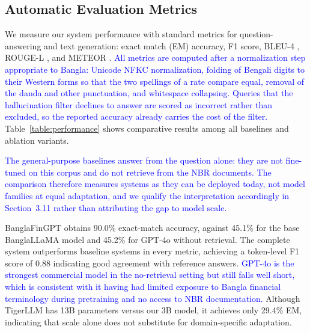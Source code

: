 \documentclass{article}
\newcommand{\revised}[1]{\textcolor{blue}{#1}}
\newcommand{\revised}[1]{#1}
\begin{document}
\subsection{Automatic Evaluation Metrics}
\label{sec:automatic-metrics}

We measure our system performance with standard metrics for question-answering and text
generation: exact match (EM) accuracy, F1 score, BLEU-4 \cite{papineni2002}, ROUGE-L
\cite{lin2004rouge}, and METEOR \cite{banerjee2005}. \revised{All metrics are computed
after a normalization step appropriate to Bangla: Unicode NFKC normalization, folding of
Bengali digits to their Western forms so that the two spellings of a rate compare
equal, removal of the danda and other punctuation, and whitespace collapsing.
Queries that the hallucination filter declines to answer are scored as incorrect rather
than excluded, so the reported accuracy already carries the cost of the filter.}
Table~\ref{table:performance} shows comparative results among all baselines and ablation
variants.

\revised{The general-purpose baselines answer from the question alone: they are not
fine-tuned on this corpus and do not retrieve from the NBR documents. The comparison
therefore measures systems as they can be deployed today, not model families at equal
adaptation, and we qualify the interpretation accordingly in Section~3.11 rather than
attributing the gap to model scale.}

BanglaFinGPT obtains 90.0\% exact-match accuracy, against 45.1\% for the base
BanglaLLaMA model and 45.2\% for GPT-4o without retrieval. The complete system
outperforms baseline systems in every metric, achieving a token-level F1 score of 0.88
indicating good agreement with reference answers. \revised{GPT-4o is the strongest
commercial model in the no-retrieval setting but still falls well short, which is
consistent with it having had limited exposure to Bangla financial terminology during
pretraining and no access to NBR documentation.} Although TigerLLM has 13B parameters
versus our 3B model, it achieves only 29.4\% EM, indicating that scale alone does not
substitute for domain-specific adaptation.
\end{document}
